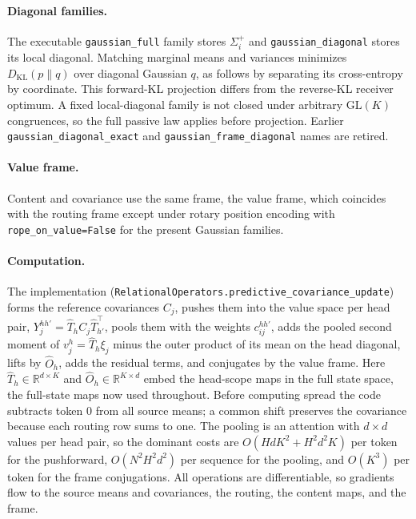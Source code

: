 \documentclass[11pt]{article}
\theoremstyle{definition}
\theoremstyle{remark}
\providecommand{\cfg}[1]{{\small\texttt{#1}}}
\providecommand{\KL}{D_{\mathrm{KL}}}
\begin{document}
\paragraph{Diagonal families.}
The executable \cfg{gaussian\_full} family stores $\Sigma_i^+$ and \cfg{gaussian\_diagonal} stores its local diagonal. Matching marginal means and variances minimizes $\KL(p\|q)$ over diagonal Gaussian $q$, as follows by separating its cross-entropy by coordinate. This forward-KL projection differs from the reverse-KL receiver optimum. A fixed local-diagonal family is not closed under arbitrary $\mathrm{GL}(K)$ congruences, so the full passive law applies before projection. Earlier \cfg{gaussian\_diagonal\_exact} and \cfg{gaussian\_frame\_diagonal} names are retired.

\paragraph{Value frame.}
Content and covariance use the same frame, the value frame, which coincides with the routing frame except under rotary position encoding with \cfg{rope\_on\_value=False} for the present Gaussian families.

\paragraph{Computation.}
The implementation (\cfg{RelationalOperators.predictive\_covariance\_update}) forms the reference covariances $C_j$, pushes them into the value space per head pair, $Y_j^{hh'}=\hat T_hC_j\hat T_{h'}^{\top}$, pools them with the weights $c_{ij}^{hh'}$, adds the pooled second moment of $v_j^{h}=\hat T_h\xi_j$ minus the outer product of its mean on the head diagonal, lifts by $\hat O_h$, adds the residual terms, and conjugates by the value frame. Here $\hat T_h\in\mathbb R^{d\times K}$ and $\hat O_h\in\mathbb R^{K\times d}$ embed the head-scope maps in the full state space, the full-state maps now used throughout. Before computing spread the code subtracts token 0 from all source means; a common shift preserves the covariance because each routing row sums to one. The pooling is an attention with $d\times d$ values per head pair, so the dominant costs are $O(HdK^2+H^2d^2K)$ per token for the pushforward, $O(N^2H^2d^2)$ per sequence for the pooling, and $O(K^3)$ per token for the frame conjugations. All operations are differentiable, so gradients flow to the source means and covariances, the routing, the content maps, and the frame.
\end{document}
